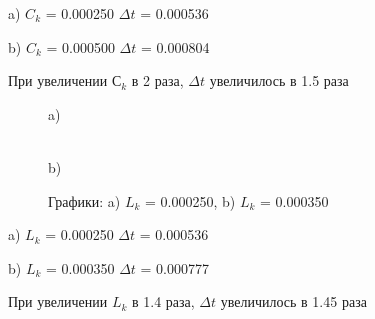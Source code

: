 a) $C_k$ = 0.000250 $\Delta t$ = 0.000536

b) $C_k$ = 0.000500 $\Delta t$ = 0.000804

При увеличении $С_k$ в 2 раза, $\Delta t$ увеличилось в 1.5 раза


\newpage

\begin{figure}[H]
\begin{minipage}[h]{0.47\linewidth}
 a) \\
\end{minipage}
\hfill
\begin{minipage}[h]{0.47\linewidth}
 \\b)
\end{minipage}
\caption{Графики: a) $L_k$ = 0.000250, b)
$L_k$ = 0.000350}
\label{fig:fig9}
\end{figure}

a) $L_k$ = 0.000250 $\Delta t$ = 0.000536

b) $L_k$ = 0.000350 $\Delta t$ = 0.000777

При увеличении $L_k$ в 1.4 раза, $\Delta t$ увеличилось в 1.45 раза

